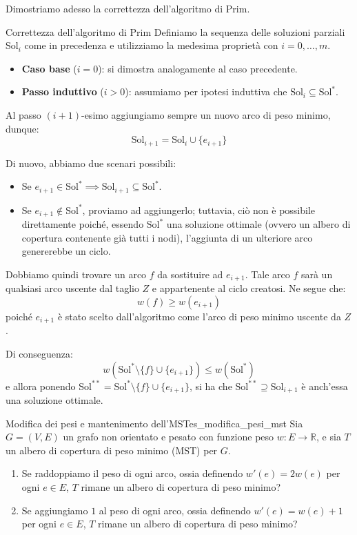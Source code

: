 \documentclass[12pt]{report}
\begin{document}
	Dimostriamo adesso la correttezza dell'algoritmo di Prim.
	\begin{dimostrazione}{Correttezza dell'algoritmo di Prim}{}
		Definiamo la sequenza delle soluzioni parziali $\text{Sol}_i$ come in precedenza e utilizziamo la medesima proprietà con $i = 0, \dots, m$.
		
		\begin{itemize}
			\item \textbf{Caso base} ($i = 0$): si dimostra analogamente al caso precedente.
			\item \textbf{Passo induttivo} ($i > 0$): assumiamo per ipotesi induttiva che $\text{Sol}_i \subseteq \text{Sol}^*$.
		\end{itemize}
		
		Al passo $(i+1)$-esimo aggiungiamo sempre un nuovo arco di peso minimo, dunque:
		\[
		\text{Sol}_{i+1} = \text{Sol}_i \cup \{e_{i+1}\}
		\]
		
		Di nuovo, abbiamo due scenari possibili:
		\begin{itemize}
			\item Se $e_{i+1} \in \text{Sol}^* \implies \text{Sol}_{i+1} \subseteq \text{Sol}^*$.
			\item Se $e_{i+1} \notin \text{Sol}^*$, proviamo ad aggiungerlo; tuttavia, ciò non è possibile direttamente poiché, essendo $\text{Sol}^*$ una soluzione ottimale (ovvero un albero di copertura contenente già tutti i nodi), l'aggiunta di un ulteriore arco genererebbe un ciclo.
		\end{itemize}
		
		Dobbiamo quindi trovare un arco $f$ da sostituire ad $e_{i+1}$. Tale arco $f$ sarà un qualsiasi arco uscente dal taglio $Z$ e appartenente al ciclo creatosi. Ne segue che:
		\[
		w(f) \ge w(e_{i+1})
		\]
		poiché $e_{i+1}$ è stato scelto dall'algoritmo come l'arco di peso minimo uscente da $Z$.
		
		Di conseguenza:
		\[
		w(\text{Sol}^* \setminus \{f\} \cup \{e_{i+1}\}) \le w(\text{Sol}^*)
		\]
		e allora ponendo $\text{Sol}^{**} = \text{Sol}^* \setminus \{f\} \cup \{e_{i+1}\}$, si ha che $\text{Sol}^{**} \supseteq \text{Sol}_{i+1}$ è anch'essa una soluzione ottimale.
	\end{dimostrazione}
	
	\begin{esercizio}{Modifica dei pesi e mantenimento dell'MST}{es_modifica_pesi_mst}
		Sia $G = (V, E)$ un grafo non orientato e pesato con funzione peso $w: E \to \mathbb{R}$, e sia $T$ un albero di copertura di peso minimo (MST) per $G$.
		\begin{enumerate}
			\item Se raddoppiamo il peso di ogni arco, ossia definendo $w'(e) = 2w(e)$ per ogni $e \in E$, $T$ rimane un albero di copertura di peso minimo?
			\item Se aggiungiamo $1$ al peso di ogni arco, ossia definendo $w'(e) = w(e) + 1$ per ogni $e \in E$, $T$ rimane un albero di copertura di peso minimo?
		\end{enumerate}
	\end{esercizio}
	
\end{document}
